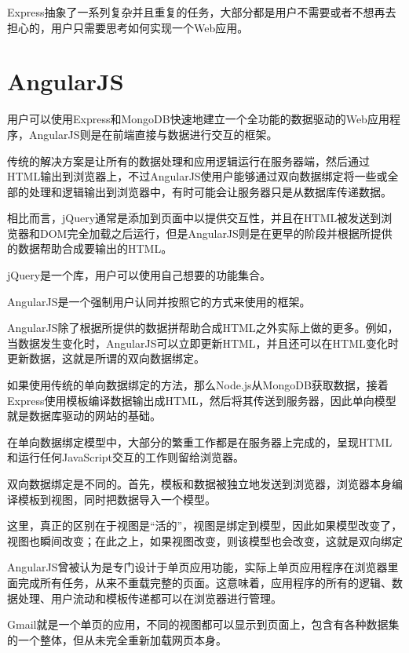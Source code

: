 Express抽象了一系列复杂并且重复的任务，大部分都是用户不需要或者不想再去担心的，用户只需要思考如何实现一个Web应用。


\section{AngularJS}

用户可以使用Express和MongoDB快速地建立一个全功能的数据驱动的Web应用程序，AngularJS则是在前端直接与数据进行交互的框架。

传统的解决方案是让所有的数据处理和应用逻辑运行在服务器端，然后通过HTML输出到浏览器上，不过AngularJS使用户能够通过双向数据绑定将一些或全部的处理和逻辑输出到浏览器中，有时可能会让服务器只是从数据库传递数据。

相比而言，jQuery通常是添加到页面中以提供交互性，并且在HTML被发送到浏览器和DOM完全加载之后运行，但是AngularJS则是在更早的阶段并根据所提供的数据帮助合成要输出的HTML。

\begin{compactitem}
\item jQuery是一个库，用户可以使用自己想要的功能集合。
\item AngularJS是一个强制用户认同并按照它的方式来使用的框架。
\end{compactitem}

AngularJS除了根据所提供的数据拼帮助合成HTML之外实际上做的更多。例如，当数据发生变化时，AngularJS可以立即更新HTML，并且还可以在HTML变化时更新数据，这就是所谓的双向数据绑定。


如果使用传统的单向数据绑定的方法，那么Node.js从MongoDB获取数据，接着Express使用模板编译数据输出成HTML，然后将其传送到服务器，因此单向模型就是数据库驱动的网站的基础。

在单向数据绑定模型中，大部分的繁重工作都是在服务器上完成的，呈现HTML和运行任何JavaScript交互的工作则留给浏览器。

双向数据绑定是不同的。首先，模板和数据被独立地发送到浏览器，浏览器本身编译模板到视图，同时把数据导入一个模型。

这里，真正的区别在于视图是“活的”，视图是绑定到模型，因此如果模型改变了，视图也瞬间改变；在此之上，如果视图改变，则该模型也会改变，这就是双向绑定

AngularJS曾被认为是专门设计于单页应用功能，实际上单页应用程序在浏览器里面完成所有任务，从来不重载完整的页面。这意味着，应用程序的所有的逻辑、数据处理、用户流动和模板传递都可以在浏览器进行管理。

Gmail就是一个单页的应用，不同的视图都可以显示到页面上，包含有各种数据集的一个整体，但从未完全重新加载网页本身。

